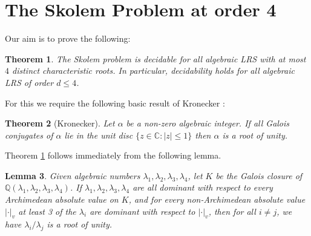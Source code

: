 \documentclass{article}\usepackage[a4paper,margin=20mm]{geometry}
\newtheorem{theorem}{Theorem}\newtheorem{lemma}[theorem]{Lemma}\newtheorem{proposition}[theorem]{Proposition}\newtheorem{corollary}[theorem]{Corollary}\newtheorem{definition}[theorem]{Definition}\newtheorem{claim}[theorem]{Claim}\newtheorem{remark}[theorem]{Remark}\newtheorem{observation}[theorem]{Observation}\newtheorem{conjecture}[theorem]{Conjecture}\newtheorem{example}[theorem]{Example}
\newcommand{\Q}{\mathbb{Q}}
\begin{document}
\section{The Skolem Problem at order 4}
Our aim is to prove the following:
\begin{theorem} \label{MainThm}
	The Skolem problem is decidable for all algebraic LRS with at most $4$ distinct characteristic roots. In particular, decidability holds for all algebraic LRS of order $d \leq 4$.
\end{theorem}
For this we require the following basic result of Kronecker \cite{Kronecker}:
\begin{theorem}[Kronecker] \label{Kronecker}
	Let $\alpha$ be a non-zero algebraic integer. If all Galois conjugates of $\alpha$ lie in the unit disc $\{z \in \mathbb C : |z| \leq 1\}$ then $\alpha$ is a root of unity.
\end{theorem}
Theorem \ref{MainThm} follows immediately from the following lemma.
\begin{lemma} \label{MainLemma}
Given algebraic numbers $\lambda_1, \lambda_2, \lambda_3, \lambda_4$, let $K$ be the Galois closure of $\Q(\lambda_1, \lambda_2, \lambda_3, \lambda_4)$. If $\lambda_1, \lambda_2, \lambda_3, \lambda_4$ are all dominant with respect to every Archimedean absolute value on $K$, and for every non-Archimedean absolute value $|\cdot|_v$ at least 3 of the $\lambda_i$ are dominant with respect to $|\cdot|_v$, then for all $i \neq j$, we have $\lambda_i/\lambda_j$ is a root of unity. 
\end{lemma}
\end{document}
